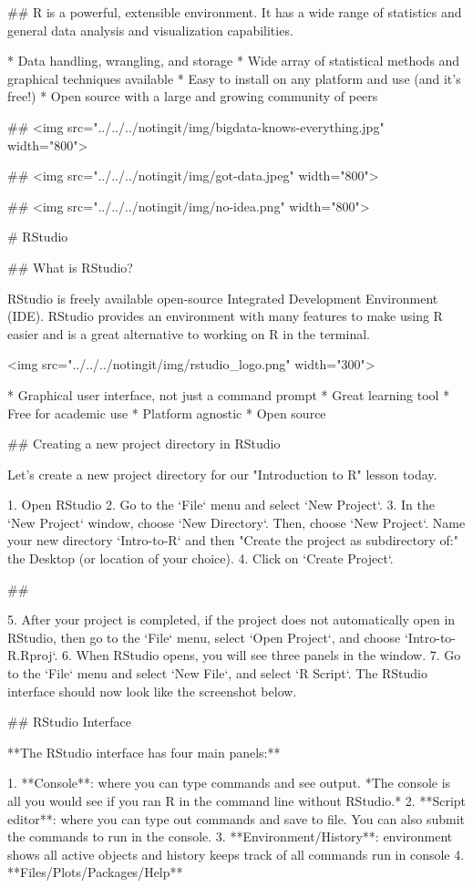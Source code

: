 ##
R is a powerful, extensible environment. It has a wide range of statistics and general data analysis and visualization capabilities.

* Data handling, wrangling, and storage
* Wide array of statistical methods and graphical techniques available
* Easy to install on any platform and use (and it’s free!)
* Open source with a large and growing community of peers

##
<img src="../../../notingit/img/bigdata-knows-everything.jpg" width="800">

##
<img src="../../../notingit/img/got-data.jpeg" width="800">

##
<img src="../../../notingit/img/no-idea.png" width="800">

# RStudio

## What is RStudio?

RStudio is freely available open-source Integrated Development Environment (IDE). RStudio provides an environment with many features to make using R easier and is a great alternative to working on R in the terminal. 

<img src="../../../notingit/img/rstudio_logo.png" width="300">

* Graphical user interface, not just a command prompt
* Great learning tool 
* Free for academic use
* Platform agnostic
* Open source

## Creating a new project directory in RStudio

Let's create a new project directory for our "Introduction to R" lesson today. 

1. Open RStudio
2. Go to the `File` menu and select `New Project`.
3. In the `New Project` window, choose `New Directory`. Then, choose `New Project`. Name your new directory `Intro-to-R` and then "Create the project as subdirectory of:" the Desktop (or location of your choice).
4. Click on `Create Project`.

##

5. After your project is completed, if the project does not automatically open in RStudio, then go to the `File` menu, select `Open Project`, and choose `Intro-to-R.Rproj`.
6. When RStudio opens, you will see three panels in the window.
7. Go to the `File` menu and select `New File`, and select `R Script`. The RStudio interface should now look like the screenshot below.


## RStudio Interface

**The RStudio interface has four main panels:**

1. **Console**: where you can type commands and see output. *The console is all you would see if you ran R in the command line without RStudio.*
2. **Script editor**: where you can type out commands and save to file. You can also submit the commands to run in the console.
3. **Environment/History**: environment shows all active objects and history keeps track of all commands run in console
4. **Files/Plots/Packages/Help**

